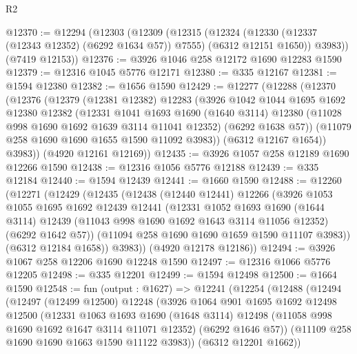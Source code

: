 \begin{lexlean}{R2}
\begin{coremodule}
@12370 := @12294
    (@12303
      (@12309
        (@12315
          (@12324 (@12330 (@12337 (@12343 @12352) (@6292 @1634 @57)) @7555) (@6312 @12151 @1650))
          @3983))
      (@7419 @12153))
@12376 := @3926 @1046 @258 @12172 @1690 @12283 @1590
@12379 := @12316 @1045 @5776 @12171
@12380 := @335 @12167
@12381 := @1594 @12380
@12382 := @1656 @1590
@12429 := @12277
    (@12288
      (@12370
        (@12376
          (@12379
            (@12381 @12382)
            @12283
            (@3926
              @1042
              @1044
              @1695
              @1692
              @12380
              @12382
              (@12331
                @1041
                @1693
                @1690
                (@1640 @3114)
                @12380
                (@11028 @998 @1690 @1692 @1639 @3114 @11041 @12352)
                (@6292 @1638 @57))
              (@11079 @258 @1690 @1690 @1655 @1590 @11092 @3983))
            (@6312 @12167 @1654))
          @3983))
      (@4920 @12161 @12169))
@12435 := @3926 @1057 @258 @12189 @1690 @12266 @1590
@12438 := @12316 @1056 @5776 @12188
@12439 := @335 @12184
@12440 := @1594 @12439
@12441 := @1660 @1590
@12488 := @12260
    (@12271
      (@12429
        (@12435
          (@12438
            (@12440 @12441)
            @12266
            (@3926
              @1053
              @1055
              @1695
              @1692
              @12439
              @12441
              (@12331
                @1052
                @1693
                @1690
                (@1644 @3114)
                @12439
                (@11043 @998 @1690 @1692 @1643 @3114 @11056 @12352)
                (@6292 @1642 @57))
              (@11094 @258 @1690 @1690 @1659 @1590 @11107 @3983))
            (@6312 @12184 @1658))
          @3983))
      (@4920 @12178 @12186))
@12494 := @3926 @1067 @258 @12206 @1690 @12248 @1590
@12497 := @12316 @1066 @5776 @12205
@12498 := @335 @12201
@12499 := @1594 @12498
@12500 := @1664 @1590
@12548 := fun (output : @1627) =>
  @12241
    (@12254
      (@12488
        (@12494
          (@12497
            (@12499 @12500)
            @12248
            (@3926
              @1064
              @901
              @1695
              @1692
              @12498
              @12500
              (@12331
                @1063
                @1693
                @1690
                (@1648 @3114)
                @12498
                (@11058 @998 @1690 @1692 @1647 @3114 @11071 @12352)
                (@6292 @1646 @57))
              (@11109 @258 @1690 @1690 @1663 @1590 @11122 @3983))
            (@6312 @12201 @1662))

\end{coremodule}
\end{lexlean}
